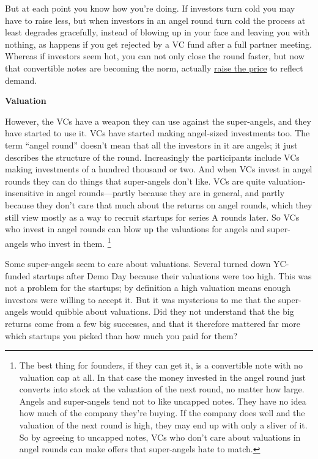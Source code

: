 \documentclass[12pt]{book}
\begin{document}
But at each point you know how you're doing. If investors turn cold you
may have to raise less, but when investors in an angel round turn cold
the process at least degrades gracefully, instead of blowing up in your
face and leaving you with nothing, as happens if you get rejected by a
VC fund after a full partner meeting. Whereas if investors seem hot, you
can not only close the round faster, but now that convertible notes are
becoming the norm, actually \href{hiresfund.html}{raise the price} to
reflect demand.

\textbf{Valuation}

However, the VCs have a weapon they can use against the super-angels,
and they have started to use it. VCs have started making angel-sized
investments too. The term ``angel round'' doesn't mean that all the
investors in it are angels; it just describes the structure of the
round. Increasingly the participants include VCs making investments of a
hundred thousand or two. And when VCs invest in angel rounds they can do
things that super-angels don't like. VCs are quite valuation-insensitive
in angel rounds---partly because they are in general, and partly because
they don't care that much about the returns on angel rounds, which they
still view mostly as a way to recruit startups for series A rounds
later. So VCs who invest in angel rounds can blow up the valuations for
angels and super-angels who invest in them. \footnote{The best thing for founders, if they can get it, is a
convertible note with no valuation cap at all. In that case the money
invested in the angel round just converts into stock at the valuation of
the next round, no matter how large. Angels and super-angels tend not to
like uncapped notes. They have no idea how much of the company they're
buying. If the company does well and the valuation of the next round is
high, they may end up with only a sliver of it. So by agreeing to
uncapped notes, VCs who don't care about valuations in angel rounds can
make offers that super-angels hate to match.}

Some super-angels seem to care about valuations. Several turned down
YC-funded startups after Demo Day because their valuations were too
high. This was not a problem for the startups; by definition a high
valuation means enough investors were willing to accept it. But it was
mysterious to me that the super-angels would quibble about valuations.
Did they not understand that the big returns come from a few big
successes, and that it therefore mattered far more which startups you
picked than how much you paid for them?
\end{document}
